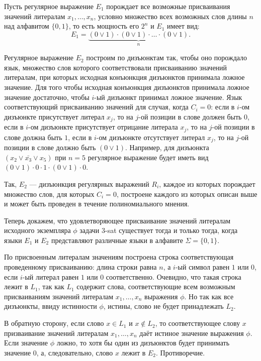 \documentclass[10pt]{article}
\begin{document}
\medskip\par Пусть регулярное выражение $E_1$ порождает все возможные присваивания значений литералам $x_1, \dots, x_n$, условно множество всех возможных слов длины $n$ над алфавитом $\{0, 1\}$, то есть мощность его $2^n$ и $E_1$ имеет вид: $$E_1=\underbrace{(0 \vee 1)\cdot(0 \vee 1)\cdot\dots\cdot (0 \vee 1)}_n.$$
\par Регулярное выражение $E_2$ построим по дизъюнктам так, чтобы оно порождало язык, множество слов которого соответствовали присваиванию значений литералам, при которых исходная конъюнкция дизъюнктов принимала ложное значение. Для того чтобы исходная конъюнкция дизъюнктов принимала ложное значение достаточно, чтобы $i$-ый дизъюнкт принимал ложное значение. Язык соответствующий присваиванию значений для случая, когда $C_i=0$: если в $i$-ом дизъюнкте присутствует литерал $x_j$, то на $j$-ой позиции в слове должен быть $0$,  если в $i$-ом дизъюнкте присутствует отрицание литерала $x_j$, то на $j$-ой позиции в слове должна быть $1$, если в $i$-ом дизъюнкте отсутствует литерал $x_j$, то на $j$-ой позиции в слове должно быть $(0\vee 1)$. Например, для дизъюнкта $(x_2\vee \bar{x_3} \vee x_5)$ при $n=5$ регулярное выражение будет иметь вид $(0\vee 1)\cdot 0 \cdot 1 \cdot (0\vee 1)\cdot 0$. 
\medskip\par Так, $E_2$ --- дизъюнкция регулярных выражений $R_i$, каждое из которых порождает множество слов, для которых $C_i=0$, построене каждого из которых описан выше и может быть проведен в течение полиномиального мнения.
\medskip\par
Теперь докажем, что удовлетворяющее присваивание значений литералам исходного экземпляра $\phi$ задачи $3$-sat существует тогда и только тогда, когда языки $E_1$ и $E_2$ представляют различные языки в алфавите $\Sigma=\{0, 1\}.$
\medskip\par По присвоенным литералам значениям построена строка соответствующая проведенному присваиванию: длина строки равна $n$, а $i$-ый символ равен $1$ или $0$, если $i$-ый литерал равен $1$ или $0$ соответственно. Очевидно, что такая строка лежит в $L_1$, так как $L_1$ содержит слова, соответствующие всем возможным присваиваниям значений литералам $x_1, \dots, x_n$ выражения $\phi$. Но так как все дизъюнкты, ввиду истинности $\phi$, истины, слово не будет принадлежать $L_2$.
\medskip\par В обратную сторону, если слово $x\in L_1$ и $x\not\in L_2$, то соответствующее слову $x$ призваивание значений литералам $x_1, \dots, x_n$ даёт истиное значение выражения $\phi$. Если значение $\phi$ ложно, то хотя бы один из дизъюнктов будет принимать значение $0$, а, следовательно, слово $x$ лежит в $E_2$. Противоречие.
\end{document}

